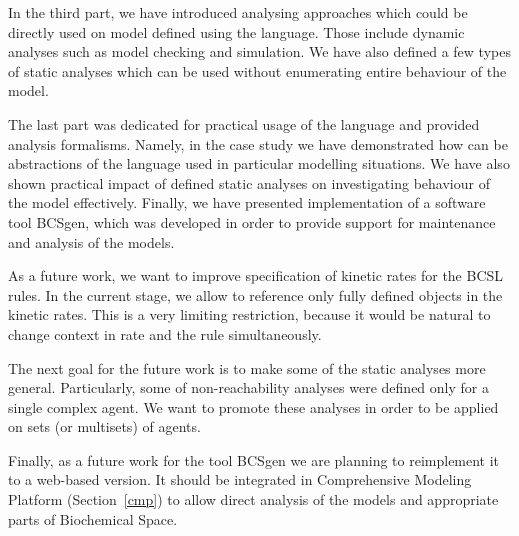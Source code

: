 \documentclass[12pt, twoside]{fithesis2} %
\begin{document}
In the third part, we have introduced analysing approaches which could be directly used on model defined using the language. Those include dynamic analyses such as model checking and simulation. We have also defined a few types of static analyses which can be used without enumerating entire behaviour of the model.

The last part was dedicated for practical usage of the language and provided analysis formalisms. Namely, in the case study we have demonstrated how can be abstractions of the language used in particular modelling situations. We have also shown practical impact of defined static analyses on investigating behaviour of the model effectively. Finally, we have presented implementation of a software tool BCSgen, which was developed in order to provide support for maintenance and analysis of the models.

As a future work, we want to improve specification of kinetic rates for the BCSL rules. In the current stage, we allow to reference only fully defined objects in the kinetic rates. This is a very limiting restriction, because it would be natural to change context in rate and the rule simultaneously.

The next goal for the future work is to make some of the static analyses more general. Particularly, some of non-reachability analyses were defined only for a single complex agent. We want to promote these analyses in order to be applied on sets (or multisets) of agents.

Finally, as a future work for the tool BCSgen we are planning to reimplement it to a web-based version. It should be integrated in Comprehensive Modeling Platform (Section~\ref{cmp}) to allow direct analysis of the models and appropriate parts of Biochemical Space.


{\small

}
\end{document}

